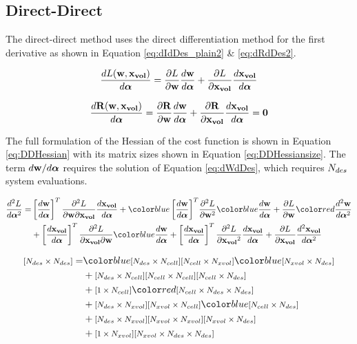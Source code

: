 \documentclass[letterpaper,12pt,]{article}
\begin{document}
\newpage
\subsection*{Direct-Direct}

The direct-direct method uses the direct differentiation method for the first derivative as shown in Equation \ref{eq:dIdDes_plain2} \& \ref{eq:dRdDes2}.

\begin{equation}
	\dfrac{dL( \mathbf{w}, \mathbf{x_{vol}} ) }{d\boldsymbol{\alpha}}
	= 
    \dfrac{\partial L}{\partial\mathbf{w}}
	\dfrac{d\mathbf{w}}{d\boldsymbol{\alpha}}
	+
	\dfrac{\partial L}{\partial\mathbf{x_{vol}}}
	\dfrac{d\mathbf{x_{vol}}}{d\boldsymbol{\alpha}}
	\label{eq:dIdDes_plain2}
\end{equation}

\begin{equation}
	\dfrac{d\mathbf{R}( \mathbf{w}, \mathbf{x_{vol}} ) }{d\boldsymbol{\alpha}}
	= 
    \dfrac{\partial\mathbf{R}}{\partial\mathbf{w}}
	\dfrac{d\mathbf{w}}{d\boldsymbol{\alpha}}
	+
	\dfrac{\partial\mathbf{R}}{\partial\mathbf{x_{vol}}}
	\dfrac{d\mathbf{x_{vol}}}{d\boldsymbol{\alpha}}
	= \mathbf{0}
	\label{eq:dRdDes2}
\end{equation}

The full formulation of the Hessian of the cost function is shown in Equation \ref{eq:DDHessian} with its matrix sizes shown in Equation \ref{eq:DDHessiansize}.
The term $d\mathbf{w}/d\boldsymbol{\alpha}$ requires the solution of Equation \ref{eq:dWdDes}, which requires $N_{des}$ system evaluations.

\begin{equation}
\begin{split}
	\DDt{L}{\balfa} 
	=&
	\trans{\Dt{\bw}{\balfa}}
	\ddelm{L}{\bw}{\xvol}
	\Dt{\xvol}{\balfa}
	+
	\blue{\trans{\Dt{\bw}{\balfa}}}
	\ddel{L}{\bw}
	\blue{\Dt{\bw}{\balfa}}
	+
	\del{L}{\bw}
	\red{\DDt{\bw}{\balfa}}
	\\
	&+
	\trans{\Dt{\xvol}{\balfa}}
	\ddelm{L}{\xvol}{\bw}
	\blue{\Dt{\bw}{\balfa}}
	+
	\trans{\Dt{\xvol}{\balfa}}
	\ddel{L}{\xvol}
	\Dt{\xvol}{\balfa}
	+
	\del{L}{\xvol}
	\DDt{\xvol}{\balfa}
\label{eq:DDHessian}
\end{split}
\end{equation}

\begin{equation}
\begin{split}
	\nxn{\ndes}{\ndes}
	=
	&
	\blue{\nxn{\ndes}{\ncell}}
	\nxn{\ncell}{\nxvol}
	\blue{\nxn{\nxvol}{\ndes}}
	\\&
	+
	\nxn{\ndes}{\ncell}
	\nxn{\ncell}{\ncell}
	\nxn{\ncell}{\ndes}
	\\&
	+
	\nxn{1}{\ncell}
	\red{\nxnxn{\ncell}{\ndes}{\ndes}}
	\\&
	+
	\nxn{\ndes}{\nxvol}
	\nxn{\nxvol}{\ncell}
	\blue{\nxn{\ncell}{\ndes}}
	\\&
	+
	\nxn{\ndes}{\nxvol}
	\nxn{\nxvol}{\nxvol}
	\nxn{\nxvol}{\ndes}
	\\&
	+
	\nxn{1}{\nxvol}
	\nxnxn{\nxvol}{\ndes}{\ndes}
\label{eq:DDHessiansize}
\end{split}
\end{equation}
\end{document}
